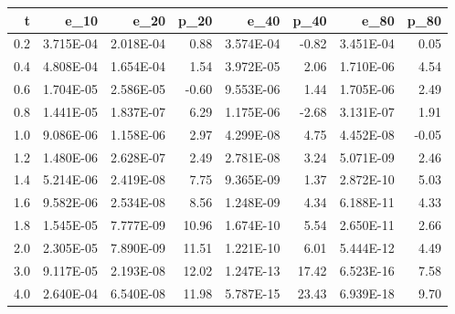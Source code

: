 \documentclass[letterpaper, 12pt]{article}
\begin{document}
	\begin{tabular}{r|rrrrrrr}
		  t        &e\_10        &e\_20        &p\_20        &e\_40        &p\_40        &e\_80        &p\_80 \\ 
		\hline
		0.2    &3.715E-04    &2.018E-04         &0.88    &3.574E-04        &-0.82    &3.451E-04         &0.05 \\ 
		0.4    &4.808E-04    &1.654E-04         &1.54    &3.972E-05         &2.06    &1.710E-06         &4.54 \\ 
		0.6    &1.704E-05    &2.586E-05        &-0.60    &9.553E-06         &1.44    &1.705E-06         &2.49 \\ 
		0.8    &1.441E-05    &1.837E-07         &6.29    &1.175E-06        &-2.68    &3.131E-07         &1.91 \\ 
		1.0    &9.086E-06    &1.158E-06         &2.97    &4.299E-08         &4.75    &4.452E-08        &-0.05 \\ 
		1.2    &1.480E-06    &2.628E-07         &2.49    &2.781E-08         &3.24    &5.071E-09         &2.46 \\ 
		1.4    &5.214E-06    &2.419E-08         &7.75    &9.365E-09         &1.37    &2.872E-10         &5.03 \\ 
		1.6    &9.582E-06    &2.534E-08         &8.56    &1.248E-09         &4.34    &6.188E-11         &4.33 \\ 
		1.8    &1.545E-05    &7.777E-09        &10.96    &1.674E-10         &5.54    &2.650E-11         &2.66 \\ 
		2.0    &2.305E-05    &7.890E-09        &11.51    &1.221E-10         &6.01    &5.444E-12         &4.49 \\ 
		3.0    &9.117E-05    &2.193E-08        &12.02    &1.247E-13        &17.42    &6.523E-16         &7.58 \\ 
		4.0    &2.640E-04    &6.540E-08        &11.98    &5.787E-15        &23.43    &6.939E-18         &9.70 \\ 
	\end{tabular}
	
\end{document}
